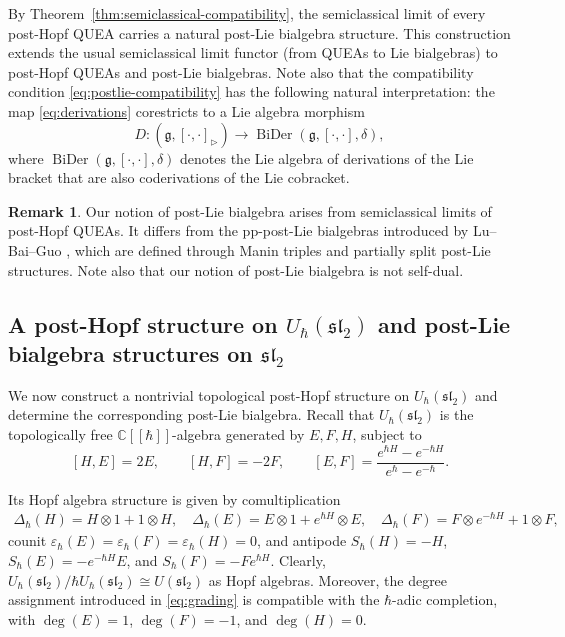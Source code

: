 \documentclass[11pt,english]{article}
\newcommand{\ten}{\otimes}
\newcommand{\eps}{\varepsilon}
\newcommand{\Del}{\Delta}
\newcommand{\tri}{\mathbin{\triangleright}}
\theoremstyle{definition}
\newtheorem{remark}[lemma]{Remark}
\begin{document}
By Theorem~\ref{thm:semiclassical-compatibility},
the semiclassical limit of every post-Hopf QUEA
carries a natural post-Lie bialgebra structure.
This construction extends the usual semiclassical
limit functor (from QUEAs to Lie bialgebras) to post-Hopf
QUEAs and post-Lie bialgebras.
Note also that the compatibility condition \eqref{eq:postlie-compatibility}  has the following natural
interpretation: the map \eqref{eq:derivations} corestricts to a Lie algebra morphism
\[
D:(\mathfrak g,[\cdot,\cdot]_{\tri})
\longrightarrow
\operatorname{BiDer}(\mathfrak g,[\cdot,\cdot],\delta),
\]
where
$\operatorname{BiDer}(\mathfrak g,[\cdot,\cdot],\delta)$
denotes the Lie algebra of derivations of the
Lie bracket that are also coderivations of the
Lie cobracket.

\begin{remark}
Our notion of post-Lie bialgebra arises from
semiclassical limits of post-Hopf QUEAs.
It differs from the pp-post-Lie bialgebras
introduced by Lu--Bai--Guo \cite{LuBaiGuo},
which are defined through Manin triples
and partially split post-Lie structures. Note also that our notion of post-Lie bialgebra is not self-dual.
\end{remark}

\subsection{A post-Hopf structure on
$U_\hbar(\mathfrak{sl}_2)$ and post-Lie bialgebra structures on $\mathfrak{sl}_2$}
\label{subsec:hbar}

We now construct a nontrivial topological
post-Hopf structure on $U_\hbar(\mathfrak{sl}_2)$
and determine the corresponding post-Lie
bialgebra.
Recall that $U_\hbar(\mathfrak{sl}_2)$
is the
topologically free $\mathbb{C}[[\hbar]]$-algebra
generated by $E,F,H$, subject to
\begin{equation}\label{eq:hbar-rel}
[H,E]=2E,\qquad
[H,F]=-2F,\qquad
[E,F]=
\frac{e^{\hbar H}-e^{-\hbar H}}
{e^\hbar-e^{-\hbar}}.
\end{equation}

Its Hopf algebra structure is given by comultiplication
\begin{equation}\label{eq:hbar-cop}
\begin{aligned}
\Del_\hbar(H)
=H\ten1+1\ten H,\quad
\Del_\hbar(E)
=E\ten1+e^{\hbar H}\ten E,\quad
\Del_\hbar(F)
=F\ten e^{-\hbar H}+1\ten F,
\end{aligned}
\end{equation} 
counit
$\eps_\hbar(E)=\eps_\hbar(F)
=\eps_\hbar(H)=0$, and antipode $S_\hbar(H)=-H$, 
$S_\hbar(E)=-e^{-\hbar H}E$,  and
$S_\hbar(F)=-Fe^{\hbar H}$.
Clearly,  $U_\hbar(\mathfrak{sl}_2)/
\hbar U_\hbar(\mathfrak{sl}_2)
\cong U(\mathfrak{sl}_2)$
as Hopf algebras. 
Moreover, the degree assignment introduced in
\eqref{eq:grading} is compatible with the
$\hbar$-adic completion, with
$\deg(E)=1$, $\deg(F)=-1$, and $\deg(H)=0$.
\end{document}
